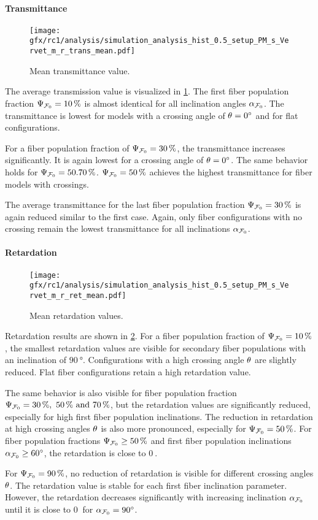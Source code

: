 \paragraph{Transmittance}
% 
\begin{figure}[!p]
\centering
\texttt{[image: gfx/rc1/analysis/simulation\_analysis\_hist\_0.5\_setup\_PM\_s\_Vervet\_m\_r\_trans\_mean.pdf]}
\caption{Mean transmittance value. }
\label{fig:sim_ana_trans}
\end{figure}
% 
The average transmission value is visualized in \cref{fig:sim_ana_trans}.
The first fiber population fraction $\textnormal{$\Psi_{\textnormal{$\mathcal{F}_0$}}$}=\SI{10}{\percent}$ is almost identical for all inclination angles $\textnormal{$\alpha_{\textnormal{$\mathcal{F}_0$}}$}$.
The transmittance is lowest for models with a crossing angle of $\textnormal{$\theta$} = \SI{0}{\degree}$ and for flat configurations.
\par
%
For a fiber population fraction of $\textnormal{$\Psi_{\textnormal{$\mathcal{F}_0$}}$}=\SI{30}{\percent}$, the transmittance increases significantly.
It is again lowest for a crossing angle of $\textnormal{$\theta$}=\SI{0}{\degree}$.
The same behavior holds for $\modelPsi=\SIlist{50,70}{\percent}$.
$\textnormal{$\Psi_{\textnormal{$\mathcal{F}_0$}}$}=\SI{50}{\percent}$ achieves the highest transmittance for fiber models with crossings.
\par
% 
The average transmittance for the last fiber population fraction $\textnormal{$\Psi_{\textnormal{$\mathcal{F}_0$}}$}=\SI{30}{\percent}$ is again reduced similar to the first case.
Again, only fiber configurations with no crossing remain the lowest transmittance for all inclinations $\textnormal{$\alpha_{\textnormal{$\mathcal{F}_0$}}$}$.
%
% 
% 
\paragraph{Retardation}
% 
\begin{figure}[!p]
\centering
\texttt{[image: gfx/rc1/analysis/simulation\_analysis\_hist\_0.5\_setup\_PM\_s\_Vervet\_m\_r\_ret\_mean.pdf]}
\caption{Mean retardation values. }
\label{fig:sim_ana_ret}
\end{figure}
% 
Retardation results are shown in \cref{fig:sim_ana_ret}.
For a fiber population fraction of $\textnormal{$\Psi_{\textnormal{$\mathcal{F}_0$}}$}=\SI{10}{\percent}$, the smallest retardation values are visible for secondary fiber populations with an inclination of $\SI{90}{\degree}$.
Configurations with a high crossing angle $\textnormal{$\theta$}$ are slightly reduced.
Flat fiber configurations retain a high retardation value.
\par
%
The same behavior is also visible for fiber population fraction $\modelPsi=\SIlist{30;50;70}{\percent}$, but the retardation values are significantly reduced, especially for high first fiber population inclinations.
The reduction in retardation at high crossing angles $\textnormal{$\theta$}$ is also more pronounced, especially for $\textnormal{$\Psi_{\textnormal{$\mathcal{F}_0$}}$}=\SI{50}{\percent}$.
For fiber population fractions $\textnormal{$\Psi_{\textnormal{$\mathcal{F}_0$}}$} \geq \SI{50}{\percent}$ and first fiber population inclinations $\textnormal{$\alpha_{\textnormal{$\mathcal{F}_0$}}$} \geq \SI{60}{\degree}$, the retardation is close to $\SI{0}{}$.
\par
%
For $\textnormal{$\Psi_{\textnormal{$\mathcal{F}_0$}}$}=\SI{90}{\percent}$, no reduction of retardation is visible for different crossing angles $\textnormal{$\theta$}$.
The retardation value is stable for each first fiber inclination parameter.
However, the retardation decreases significantly with increasing inclination $\textnormal{$\alpha_{\textnormal{$\mathcal{F}_0$}}$}$ until it is close to $\SI{0}{}$ for $\textnormal{$\alpha_{\textnormal{$\mathcal{F}_0$}}$}=\SI{90}{\degree}$.
% 
% 
% 
